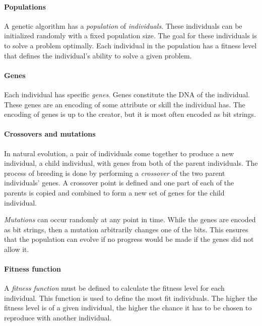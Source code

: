 \paragraph{Populations}

A genetic algorithm has a \emph{population} of \emph{individuals}. These individuals can be initialized randomly with a fixed population size.
The goal for these individuals is to solve a problem optimally. Each individual in the population has a fitness level that defines the individual's ability to solve a given problem.

\paragraph{Genes}

Each individual has specific \emph{genes}. Genes constitute the DNA of the individual. These genes are an encoding of some attribute or skill the individual has. The encoding of genes is up to the creator, but it is most often encoded as bit strings.

\paragraph{Crossovers and mutations}

In natural evolution, a pair of individuals come together to produce a new individual, a child individual, with genes from both of the parent individuals. The process of breeding is done by performing a \emph{crossover} of the two parent individuals' genes. A crossover point is defined and one part of each of the parents is copied and combined to form a new set of genes for the child individual.


\emph{Mutations} can occur randomly at any point in time. While the genes are encoded as bit strings, then a mutation arbitrarily changes one of the bits. This ensures that the population can evolve if no progress would be made if the genes did not allow it.

\paragraph{Fitness function}

A \emph{fitness function} must be defined to calculate the fitness level for each individual. This function is used to define the most fit individuals. The higher the fitness level is of a given individual, the higher the chance it has to be chosen to reproduce with another individual.

